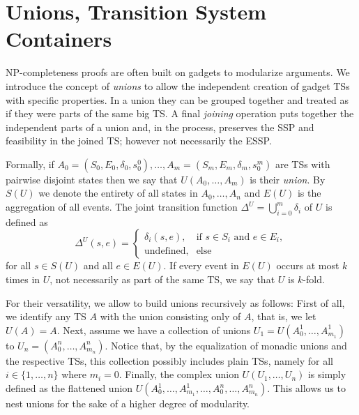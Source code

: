 \documentclass[english]{lipics_hacked}
\begin{document}

\section{Unions, Transition System Containers}
\label{sec:UnionsTSContainers}

NP-completeness proofs are often built on gadgets to modularize arguments.
We introduce the concept of \emph{unions} to allow the independent creation of gadget TSs with specific properties.
In a union they can be grouped together and treated as if they were parts of the same big TS.
A final \emph{joining} operation puts together the independent parts of a union and, in the process, preserves the SSP and feasibility in the joined TS; however not necessarily the ESSP.

Formally, if $A_0=(S_0,E_0,\delta_0,s_0^0), \dots ,A_m=(S_m,E_m,\delta_m,s_0^m)$ are TSs with pairwise disjoint states then we say that $U(A_0, \dots, A_m)$ is their \emph{union}.
By $S(U)$ we denote the entirety of all states in $A_0, \dots, A_n$ and $E(U)$ is the aggregation of all events.
The joint transition function $\Delta^U = \bigcup_{i=0}^m \delta_i$ of $U$ is defined as 
\[
\Delta^U(s,e) = \begin{cases}
\delta_i(s,e), & \text{if } s \in S_i \text{ and } e \in E_i,\\
\text{undefined}, & \text{else}
\end{cases}
\]
for all $s\in S(U)$ and all $e \in E(U)$.
If every event in $E(U)$ occurs at most $k$ times in $U$, not necessarily as part of the same TS, we say that $U$ is $k$-fold.

For their versatility, we allow to build unions recursively as follows:
First of all, we identify any TS $A$ with the union consisting only of $A$, that is, we let $U(A) = A$.   
Next, assume we have a collection of unions $U_1= U(A^1_0,\dots,A^1_{m_1})$ to $U_n=(A^n_0,\dots,A^n_{m_n})$.
Notice that, by the equalization of monadic unions and the respective TSs, this collection possibly includes plain TSs, namely for all $i \in \{1, \dots, n\}$ where $m_i = 0$.
Finally, the complex union $U(U_1,\dots,U_n)$ is simply defined as the flattened union $U(A^1_0,\dots,A^1_{m_1},\dots, A^n_0,\dots,A^n_{m_n})$.
This allows us to nest unions for the sake of a higher degree of modularity.
\end{document}
